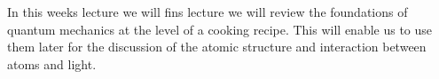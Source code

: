 In this weeks lecture we will fins lecture we will review the foundations of quantum mechanics at the level of a cooking recipe. This will enable us to use them later for the discussion of the atomic structure and interaction between atoms and light.
